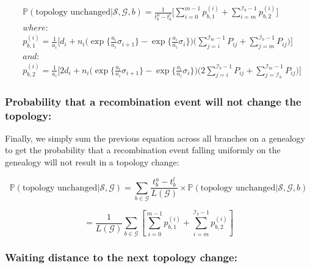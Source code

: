 \documentclass[11pt]{article}
\begin{document}
\begin{equation}
\begin{aligned}
	&\mathbb{P}(\textrm{topology unchanged} | \mathcal{S},\mathcal{G},b) = 
	\frac{1}{t_b^u - t_b^l} \Bigg[
		\sum_{i=0}^{m-1}p_{b,1}^{(i)} + 
		\sum_{i=m}^{\mathcal{I}_b-1}p_{b,2}^{(i)}
	\Bigg]
	\\
	&where: 
	\\
	&p_{b,1}^{(i)} = 
		\frac{1}{a_i} \Bigg[
			d_i+n_i \bigg(
				\exp\bigg\{\frac{a_i}{n_i}\sigma_{i+1}\bigg\} - 
				\exp\bigg\{\frac{a_i}{n_i}\sigma_i\bigg\}
			\bigg)
		\bigg(
			\sum_{j=i}^{\mathcal{I}_{bc}-1}P_{ij} + \sum_{j=m}^{\mathcal{I}_b-1}P_{ij}
		\bigg)
	\Bigg]
	\\
	&and: 
	\\
	&p_{b,2}^{(i)} = 
		\frac{1}{a_i} \Bigg[
			2d_i + n_i \bigg(
				\exp\bigg\{\frac{a_i}{n_i}\sigma_{i+1}\bigg\} - 
				\exp\bigg\{\frac{a_i}{n_i}\sigma_{i}\bigg\}
			\bigg)
		\bigg(
			2\sum_{j=i}^{\mathcal{I}_b-1}P_{ij} + \sum_{j=\mathcal{I}_b}^{\mathcal{I}_{bc}-1}P_{ij}
		\bigg)
	\Bigg]
    \end{aligned}
\end{equation}

\subsubsection{Probability that a recombination event will not change the topology:}
Finally, we simply sum the previous equation across all branches on a
genealogy to get the probability that a recombination event falling 
uniformly on the genealogy will not result in a topology change:

\begin{equation*}
    \mathbb{P}(\textrm{topology unchanged} | \mathcal{S},\mathcal{G}) = 
    \sum_{b \in \mathcal{G}}\frac{t_b^u-t_b^l}{L(\mathcal{G})} 
    \times 
    \mathbb{P}(\textrm{topology unchanged} | \mathcal{S},\mathcal{G},b)
\end{equation*}

\begin{equation}
    = \frac{1}{L(\mathcal{G})}\sum_{b \in \mathcal{G}}\left[\sum_{i=0}^{m-1}p_{b,1}^{(i)}+\sum_{i=m}^{\mathcal{I}_b-1}p_{b,2}^{(i)}\right]
\end{equation}

\subsubsection{Waiting distance to the next topology change:}
\end{document}
